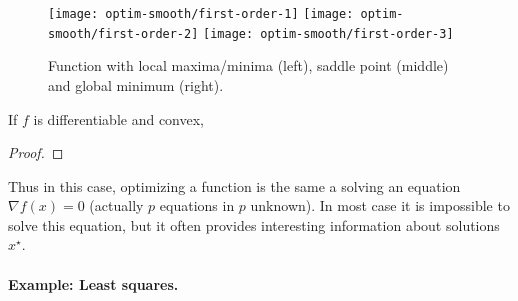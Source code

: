 \begin{figure}
\centering
\texttt{[image: optim-smooth/first-order-1]} \quad
\texttt{[image: optim-smooth/first-order-2]} \quad
\texttt{[image: optim-smooth/first-order-3]} 
\caption{\label{fig-first-order}
Function with local maxima/minima (left),  saddle point (middle) and global minimum (right). 
}
\end{figure}


\begin{prop} 
If $f$ is differentiable and convex, 
\end{prop}
\begin{proof}
\end{proof}

Thus in this case, optimizing a function is the same a solving an equation $\nabla f(x)=0$ (actually $p$ equations in $p$ unknown).
%
In most case it is impossible to solve this equation, but it often provides interesting information about solutions $x^\star$.


\paragraph{Example: Least squares.}

